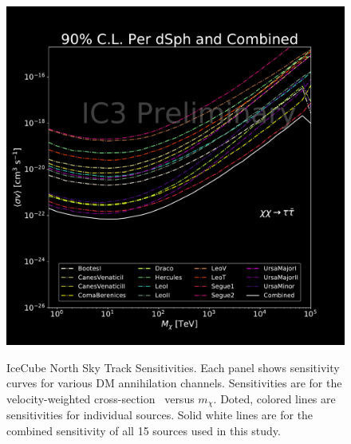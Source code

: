 \begin{figure}[h]
{        \includegraphics[scale=0.3]{figures/ic_DM/dm_plots/tautau_money_plot_comb.pdf}
    }
    \caption{IceCube North Sky Track Sensitivities. Each panel shows sensitivity curves for various DM annihilation channels. Sensitivities are for the velocity-weighted cross-section \sv~versus $m_\chi$. Doted, colored lines are sensitivities for individual sources. Solid white lines are for the combined sensitivity of all 15 \GS sources used in this study.}
    \label{fig:icDM_sensitivity_2of2}
\end{figure}

